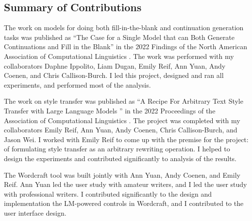 

\subsection{Summary of Contributions}
The work on models for doing both fill-in-the-blank and continuation generation tasks was published as ``The Case for a Single Model that can Both Generate Continuations and Fill in the Blank'' in the 2022 Findings of the North American Association of Computational Linguistics \citep{fitb_fite}.
The work was performed with my collaborators Daphne Ippolito, Liam Dugan, Emily Reif, Ann Yuan, Andy Coenen, and Chris Callison-Burch.
I led this project, designed and ran all experiments, and performed most of the analysis.

The work on style transfer was published as ``A Recipe For Arbitrary Text Style Transfer with Large Language Models
'' in the 2022 Proceedings of the Association of Computational Linguistics \citep{reif2021recipe}.
The project was completed with my collaborators Emily Reif, Ann Yuan, Andy Coenen, Chris Callison-Burch, and Jason Wei.
I worked with Emily Reif to come up with the premise for the project: of formulating style transfer as an arbitrary rewriting operation.
I helped to design the experiments and contributed significantly to analysis of the results.

The Wordcraft tool was built jointly with Ann Yuan, Andy Coenen, and Emily Reif.
Ann Yuan led the user study with amateur writers, and I led the user study with professional writers.
I contributed significantly to the design and implementation the LM-powered controls in Wordcraft, and I contributed to the user interface design.